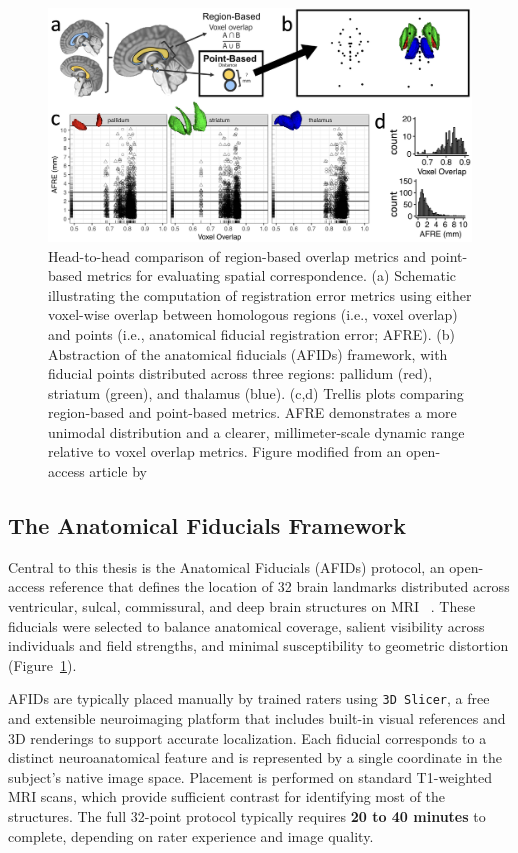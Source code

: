 \begin{figure}[hbt!]
    \centering
    \includegraphics[width=1\linewidth]{figs/ch1_Figure_afidsvsoverlap2.png}
    \caption{Head-to-head comparison of region-based overlap metrics and point-based metrics for evaluating spatial correspondence. (a) Schematic illustrating the computation of registration error metrics using either voxel-wise overlap between homologous regions (i.e., voxel overlap) and points (i.e., anatomical fiducial registration error; AFRE). (b) Abstraction of the anatomical fiducials (AFIDs) framework, with fiducial points distributed across three regions: pallidum (red), striatum (green), and thalamus (blue). (c,d) Trellis plots comparing region-based and point-based metrics. AFRE demonstrates a more unimodal distribution and a clearer, millimeter-scale dynamic range relative to voxel overlap metrics. Figure modified from an open-access article by \cite{Lau2019-eh}}
    \label{fig:ch1_Figure_afidsvsoverlap}
\end{figure}

\subsection{The Anatomical Fiducials Framework}

Central to this thesis is the Anatomical Fiducials (AFIDs) protocol, an open-access reference that defines the location of 32 brain landmarks distributed across ventricular, sulcal, commissural, and deep brain structures on MRI ~\cite{Lau2019-eh}. These fiducials were selected to balance anatomical coverage, salient visibility across individuals and field strengths, and minimal susceptibility to geometric distortion (Figure~\ref{fig:ch1_Figure_afidsvsoverlap}).

AFIDs are typically placed manually by trained raters using \texttt{3D Slicer}, a free and extensible neuroimaging platform that includes built-in visual references and 3D renderings to support accurate localization. Each fiducial corresponds to a distinct neuroanatomical feature and is represented by a single coordinate in the subject’s native image space. Placement is performed on standard T1-weighted MRI scans, which provide sufficient contrast for identifying most of the structures. The full 32-point protocol typically requires \textbf{20 to 40 minutes} to complete, depending on rater experience and image quality.

